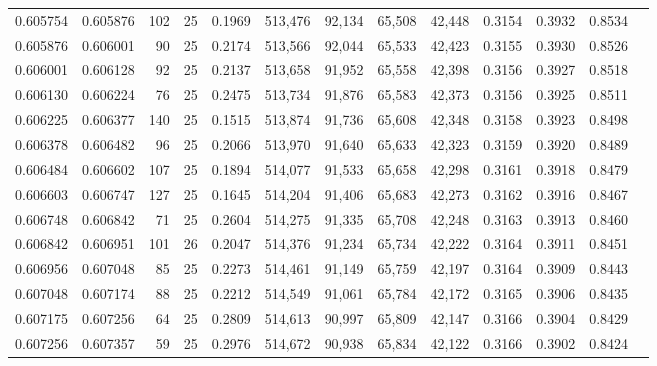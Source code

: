 \begin{tabular}{rrrrrrrrrrrrr}
0.605754 & 0.605876 &   102 &  25 &                                     0.1969 & 513,476 &  92,134 &  65,508 &  42,448 & 0.3154 & 0.3932 & 0.8534 \\
0.605876 & 0.606001 &    90 &  25 &                                     0.2174 & 513,566 &  92,044 &  65,533 &  42,423 & 0.3155 & 0.3930 & 0.8526 \\
0.606001 & 0.606128 &    92 &  25 &                                     0.2137 & 513,658 &  91,952 &  65,558 &  42,398 & 0.3156 & 0.3927 & 0.8518 \\
0.606130 & 0.606224 &    76 &  25 &                                     0.2475 & 513,734 &  91,876 &  65,583 &  42,373 & 0.3156 & 0.3925 & 0.8511 \\
0.606225 & 0.606377 &   140 &  25 &                                     0.1515 & 513,874 &  91,736 &  65,608 &  42,348 & 0.3158 & 0.3923 & 0.8498 \\
0.606378 & 0.606482 &    96 &  25 &                                     0.2066 & 513,970 &  91,640 &  65,633 &  42,323 & 0.3159 & 0.3920 & 0.8489 \\
0.606484 & 0.606602 &   107 &  25 &                                     0.1894 & 514,077 &  91,533 &  65,658 &  42,298 & 0.3161 & 0.3918 & 0.8479 \\
0.606603 & 0.606747 &   127 &  25 &                                     0.1645 & 514,204 &  91,406 &  65,683 &  42,273 & 0.3162 & 0.3916 & 0.8467 \\
0.606748 & 0.606842 &    71 &  25 &                                     0.2604 & 514,275 &  91,335 &  65,708 &  42,248 & 0.3163 & 0.3913 & 0.8460 \\
0.606842 & 0.606951 &   101 &  26 &                                     0.2047 & 514,376 &  91,234 &  65,734 &  42,222 & 0.3164 & 0.3911 & 0.8451 \\
0.606956 & 0.607048 &    85 &  25 &                                     0.2273 & 514,461 &  91,149 &  65,759 &  42,197 & 0.3164 & 0.3909 & 0.8443 \\
0.607048 & 0.607174 &    88 &  25 &                                     0.2212 & 514,549 &  91,061 &  65,784 &  42,172 & 0.3165 & 0.3906 & 0.8435 \\
0.607175 & 0.607256 &    64 &  25 &                                     0.2809 & 514,613 &  90,997 &  65,809 &  42,147 & 0.3166 & 0.3904 & 0.8429 \\
0.607256 & 0.607357 &    59 &  25 &                                     0.2976 & 514,672 &  90,938 &  65,834 &  42,122 & 0.3166 & 0.3902 & 0.8424 \\

\end{tabular}
